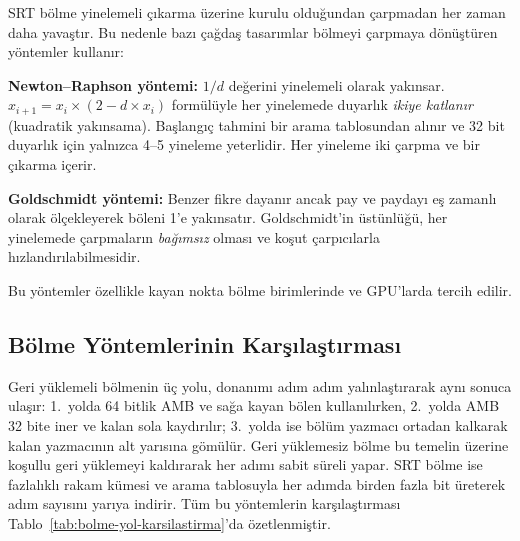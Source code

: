 \begin{bilginot}
SRT bölme yinelemeli çıkarma üzerine kurulu olduğundan çarpmadan her zaman daha yavaştır. Bu nedenle bazı çağdaş tasarımlar bölmeyi çarpmaya dönüştüren yöntemler kullanır:

\textbf{Newton--Raphson yöntemi:} $1/d$ değerini yinelemeli olarak yakınsar. $x_{i+1} = x_i \times (2 - d \times x_i)$ formülüyle her yinelemede duyarlık \emph{ikiye katlanır} (kuadratik yakınsama). Başlangıç tahmini bir arama tablosundan alınır ve 32 bit duyarlık için yalnızca 4--5 yineleme yeterlidir. Her yineleme iki çarpma ve bir çıkarma içerir.

\textbf{Goldschmidt yöntemi:} Benzer fikre dayanır ancak pay ve paydayı eş zamanlı olarak ölçekleyerek böleni 1'e yakınsatır. Goldschmidt'in üstünlüğü, her yinelemede çarpmaların \emph{bağımsız} olması ve koşut çarpıcılarla hızlandırılabilmesidir.

Bu yöntemler özellikle kayan nokta bölme birimlerinde ve GPU'larda tercih edilir.
\end{bilginot}

\subsection{Bölme Yöntemlerinin Karşılaştırması}

Geri yüklemeli bölmenin üç yolu, donanımı adım adım yalınlaştırarak aynı sonuca ulaşır: 1.\ yolda 64 bitlik AMB ve sağa kayan bölen kullanılırken, 2.\ yolda AMB 32 bite iner ve kalan sola kaydırılır; 3.\ yolda ise bölüm yazmacı ortadan kalkarak kalan yazmacının alt yarısına gömülür. Geri yüklemesiz bölme bu temelin üzerine koşullu geri yüklemeyi kaldırarak her adımı sabit süreli yapar. SRT bölme ise fazlalıklı rakam kümesi ve arama tablosuyla her adımda birden fazla bit üreterek adım sayısını yarıya indirir. Tüm bu yöntemlerin karşılaştırması Tablo~\ref{tab:bolme-yol-karsilastirma}'da özetlenmiştir.

